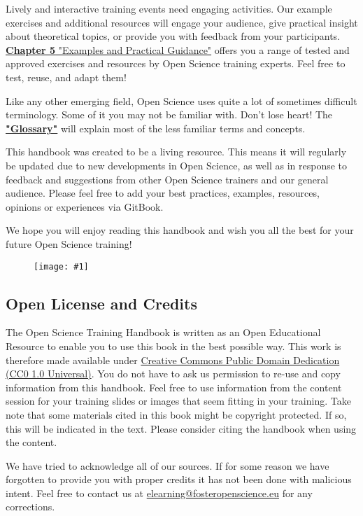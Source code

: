 \documentclass{article}
\newlength{\imgwidth}
\newcommand\scaledgraphics[2]{%
                
\settowidth{\imgwidth}{\texttt{[image: \#1]}}%
                
\setlength{\imgwidth}{\minof{\imgwidth}{#2\textwidth}}%
                
\texttt{[image: \#1]}%
                
}
\begin{document}
Lively and interactive training events need engaging activities. Our example exercises and additional resources will engage your audience, give practical insight about theoretical topics, or provide you with feedback from your participants. \textbf{\href{https://github.com/Open-Science-Training-Handbook/Open-Science-Training-Handbook_EN/tree/master/05ExamplesAndPracticalGuidance}{Chapter 5}}\href{https://github.com/Open-Science-Training-Handbook/Open-Science-Training-Handbook_EN/tree/master/05ExamplesAndPracticalGuidance}{ "Examples and Practical Guidance"} offers you a range of tested and approved exercises and resources by Open Science training experts. Feel free to test, reuse, and adapt them!


Like any other emerging field, Open Science uses quite a lot of sometimes difficult terminology. Some of it you may not be familiar with. Don’t lose heart! The \textbf{\href{https://github.com/Open-Science-Training-Handbook/Open-Science-Training-Handbook_EN/tree/master/06Glossary}{"Glossary"}} will explain most of the less familiar terms and concepts.


This handbook was created to be a living resource. This means it will regularly be updated due to new developments in Open Science, as well as in response to feedback and suggestions from other Open Science trainers and our general audience. Please feel free to add your best practices, examples, resources, opinions or experiences via GitBook.


We hope you will enjoy reading this handbook and wish you all the best for your future Open Science training!

\begin{figure}
\scaledgraphics{bc14044b-eec3-4ed3-b0e7-e2156edefa58.png}{1}
\label{F71487151}
\end{figure}


\subsection{Open License and Credits}\label{open-license-and-credits}



The Open Science Training Handbook is written as an Open Educational Resource to enable you to use this book in the best possible way. This work is therefore made available under \href{https://creativecommons.org/publicdomain/zero/1.0/}{Creative Commons Public Domain Dedication (CC0 1.0 Universal)}. You do not have to ask us permission to re-use and copy information from this handbook. Feel free to use information from the content session for your training slides or images that seem fitting in your training. Take note that some materials cited in this book might be copyright protected. If so, this will be indicated in the text. Please consider citing the handbook when using the content.


We have tried to acknowledge all of our sources. If for some reason we have forgotten to provide you with proper credits it has not been done with malicious intent. Feel free to contact us at \href{mailto:elearning@fosteropenscience.eu}{elearning@fosteropenscience.eu} for any corrections.
\end{document}
